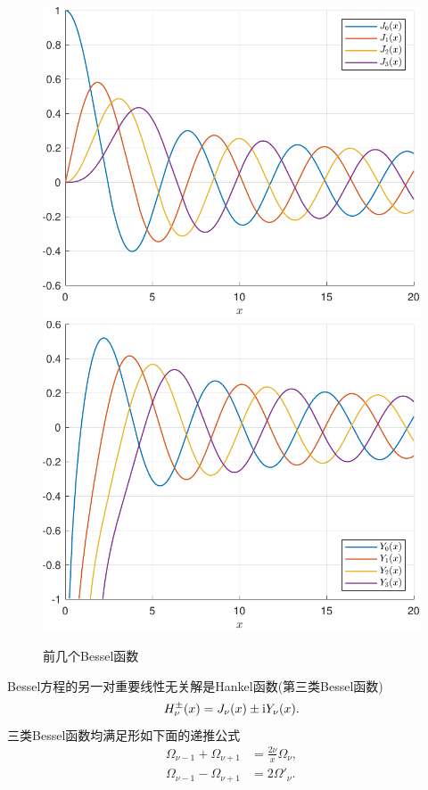 \begin{figure}[!htp]
    \centering
      {\includegraphics[width=0.45\linewidth]{figures/BesselJ.pdf}}
      {\includegraphics[width=0.45\linewidth]{figures/BesselY.pdf}}
    \caption{前几个Bessel函数}
    \label{fig:Bessel function}
\end{figure}

Bessel方程的另一对重要线性无关解是Hankel函数(第三类Bessel函数)
\begin{equation}
    H_\nu^\pm(x)=J_\nu(x)\pm\mathrm{i} Y_\nu(x).
\end{equation}
三类Bessel函数均满足形如下面的递推公式
\begin{align*}
    \Omega_{\nu-1}+\Omega_{\nu+1}&=\frac{2\nu}x\Omega_\nu,\\
    \Omega_{\nu-1}-\Omega_{\nu+1}&=2\Omega'_\nu.
\end{align*}


